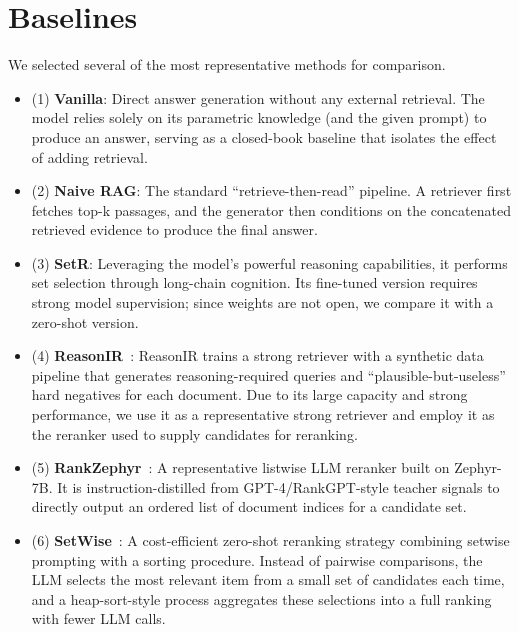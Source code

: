 \documentclass[11pt]{article}
\begin{document}
\section{Baselines}
\label{sec:appendix-baselines}
We selected several of the most representative methods for comparison. 
\begin{itemize}[label={}]
    \item (1) \textbf{Vanilla}: Direct answer generation without any external retrieval. The model relies solely on its parametric knowledge (and the given prompt) to produce an answer, serving as a closed-book baseline that isolates the effect of adding retrieval.
    \item (2) \textbf{Naive RAG}: The standard ``retrieve-then-read'' pipeline. A retriever first fetches top-k passages, and the generator then conditions on the concatenated retrieved evidence to produce the final answer.

    \item (3) \textbf{SetR}: Leveraging the model's powerful reasoning capabilities, it performs set selection through long-chain cognition. Its fine-tuned version requires strong model supervision; since weights are not open, we compare it with a zero-shot version.
    
    \item (4)\textbf{ ReasonIR}~\citep{shao2025reasonir}: ReasonIR trains a strong retriever with a synthetic data pipeline that generates reasoning-required queries and “plausible-but-useless” hard negatives for each document. Due to its large capacity and strong performance, we use it as a representative strong retriever and employ it as the reranker used to supply candidates for reranking.
    
    \item (5) \textbf{RankZephyr}~\citep{pradeep2023rankzephyr}: A representative listwise LLM reranker built on Zephyr-7B. It is instruction-distilled from GPT-4/RankGPT-style teacher signals to directly output an ordered list of document indices for a candidate set.
    
    \item (6) \textbf{SetWise}~\citep{zhuang2024setwise}: A cost-efficient zero-shot reranking strategy combining setwise prompting with a sorting procedure. Instead of pairwise comparisons, the LLM selects the most relevant item from a small set of candidates each time, and a heap-sort-style process aggregates these selections into a full ranking with fewer LLM calls.
    

\end{itemize}
\end{document}
